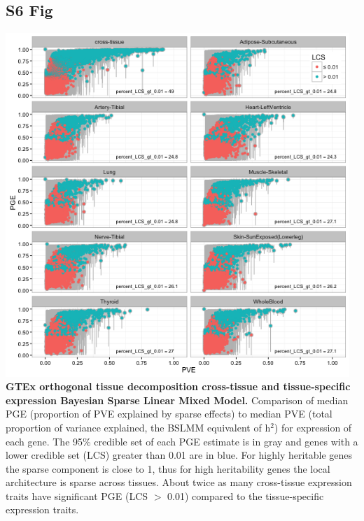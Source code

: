 \documentclass[10pt,letterpaper]{article}
\begin{document}
\begin{singlespace}
\subsection*{S6 Fig}
\includegraphics[width=13cm]{Figures/GenArch_Supp/S5Fig.png}
\label{S6_Fig}
{\bf GTEx orthogonal tissue decomposition cross-tissue and tissue-specific expression Bayesian Sparse Linear Mixed Model.} Comparison of median PGE (proportion of PVE explained by sparse effects) to median PVE (total proportion of variance explained, the BSLMM equivalent of h$^2$) for expression of each gene. The 95\% credible set of each PGE estimate is in gray and genes with a lower credible set (LCS) greater than 0.01 are in blue. For highly heritable genes the sparse component is close to 1, thus for high heritability genes the local architecture is sparse across tissues. About twice as many cross-tissue expression traits have significant PGE (LCS $>$ 0.01) compared to the tissue-specific expression traits.


\end{singlespace}
\end{document}
